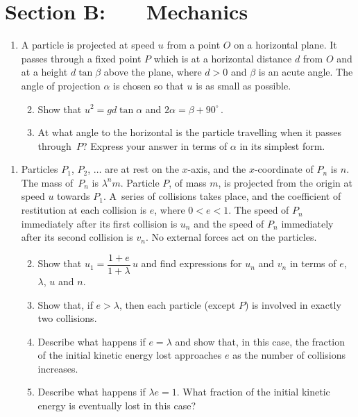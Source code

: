 \documentclass[a4, 11pt]{report}
\newlength{\qspace}
\newcounter{qnumber}
\newenvironment{question}%
 {\vspace{\qspace}
  \begin{enumerate}[\bfseries 1\quad][10]%
    \setcounter{enumi}{\value{qnumber}}%
    \item%
 }
{
  \end{enumerate}
  \filbreak
  \stepcounter{qnumber}
 }
\newenvironment{questionparts}[1][1]%
 {
  \begin{enumerate}[\bfseries (i)]%
    \setcounter{enumii}{#1}
    \addtocounter{enumii}{-1}
    \setlength{\itemsep}{5mm}
    \setlength{\parskip}{8pt}
 }
 {
  \end{enumerate}
 }
\begin{document}
\section*{Section B: \ \ \ Mechanics}



\begin{question}

A particle is projected at speed $u$ from a point $O$ on a horizontal plane.
It
passes through a fixed point $P$ which is at a horizontal distance $d$
from $O$ and at   a height  
$d \tan \beta$ above the plane, where $d>0$ and
 $\beta $ is an acute angle.
The  
 angle of projection $\alpha$ is chosen so that $u$ is as small as
possible. 

\begin{questionparts}
\item
Show 
that 
 $u^2 = gd \tan \alpha$ and 
$2\alpha = \beta + 90^\circ\,$.
\item
At what angle to the horizontal is the particle travelling when it 
passes through~$P$? Express your answer in terms of $\alpha$ in its 
simplest form.
\end{questionparts}
\end{question}





\begin{question}

Particles $P_1$, $P_2$, $\ldots$
are at rest on the $x$-axis, and the 
$x$-coordinate of $P_n$ is $n$. 
The  mass of~$P_n$ is $\lambda^nm$.
Particle $P$, of mass $m$, is projected 
from the origin at speed $u$ towards $P_1$.
A~series of collisions takes place, and the coefficient of 
restitution at each collision is $e$, where $0<e<1$. The speed of 
$P_n$ immediately after its first collision is $u_n$ and the 
speed of $P_n$ immediately after its second collision is  $v_n$.
No external forces act on the particles.


\begin{questionparts}

\item Show that $u_1=\dfrac{1+e}{1+\lambda}\, u$ and find  expressions for 
$u_n$ and $v_n$  in terms of $e$, $\lambda$, $u$ and $n$.

\item Show that, if $e > \lambda$, then each particle (except $P$)
 is involved 
in exactly two collisions.

\item Describe what happens if $e=\lambda$ and show that, in this case, 
the fraction of the initial kinetic energy lost approaches $e$ as the number of 
collisions increases.

\item Describe what happens if $\lambda e=1$. What fraction of the initial
kinetic energy is \mbox{eventually} lost in this case?

\end{questionparts}

\end{question}
\end{document}
